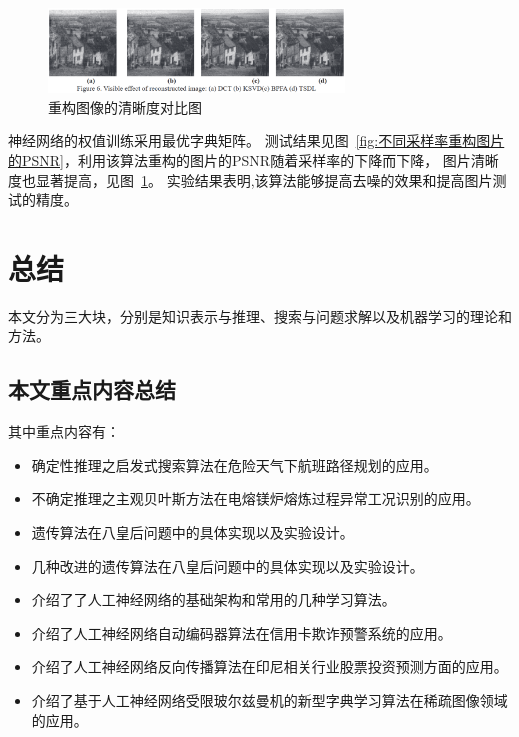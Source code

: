 \documentclass[12pt,a4paper,UTF8]{ctexart}
\begin{document}
\begin{figure}[htpb]
    \centering
    \includegraphics[width=0.7\textwidth]{allpicture/重构图像的清晰度对比图.eps}
    \caption{重构图像的清晰度对比图}
    \label{fig:重构图像的清晰度对比图}
\end{figure}
神经网络的权值训练采用最优字典矩阵。
测试结果见图~\ref{fig:不同采样率重构图片的PSNR}，利用该算法重构的图片的PSNR随着采样率的下降而下降，
图片清晰度也显著提高，见图~\ref{fig:重构图像的清晰度对比图}。
实验结果表明,该算法能够提高去噪的效果和提高图片测试的精度。
\section{总结}
本文分为三大块，分别是知识表示与推理、搜索与问题求解以及机器学习的理论和方法。
\subsection{本文重点内容总结}
其中重点内容有：
\begin{itemize}
    \item 确定性推理之启发式搜索算法在危险天气下航班路径规划的应用。
    \item 不确定推理之主观贝叶斯方法在电熔镁炉熔炼过程异常工况识别的应用。
    \item 遗传算法在八皇后问题中的具体实现以及实验设计。
    \item 几种改进的遗传算法在八皇后问题中的具体实现以及实验设计。
    \item 介绍了了人工神经网络的基础架构和常用的几种学习算法。
    \item 介绍了人工神经网络自动编码器算法在信用卡欺诈预警系统的应用。
    \item 介绍了人工神经网络反向传播算法在印尼相关行业股票投资预测方面的应用。
    \item 介绍了基于人工神经网络受限玻尔兹曼机的新型字典学习算法在稀疏图像领域的应用。
\end{itemize}
\end{document}
